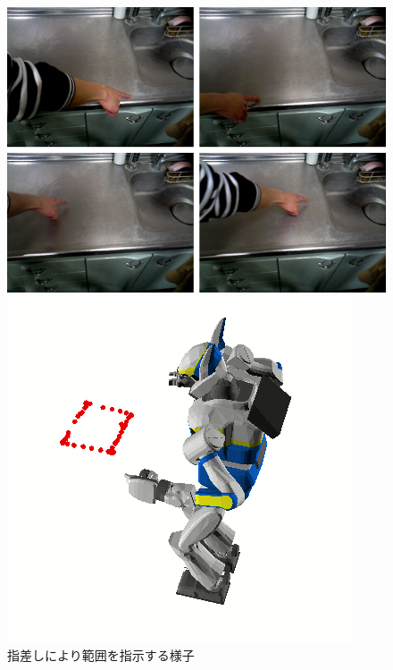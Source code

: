 \documentclass[twocolumn]{preport}
\begin{document}
\begin{figure}[htbp]
  \begin{center}
    \begin{minipage}{0.48\hsize}
      \begin{center}
        \includegraphics[clip, width=1.0\columnwidth]{figs/pointing_area_image}
      \end{center}
    \end{minipage}
    \begin{minipage}{0.48\hsize}
      \begin{center}
        \includegraphics[clip, width=0.8\columnwidth]{figs/pointing_area}
      \end{center}
    \end{minipage}
    \caption{指差しにより範囲を指示する様子}
    \label{figure:pointing_area}
  \end{center}
\end{figure}
\end{document}
